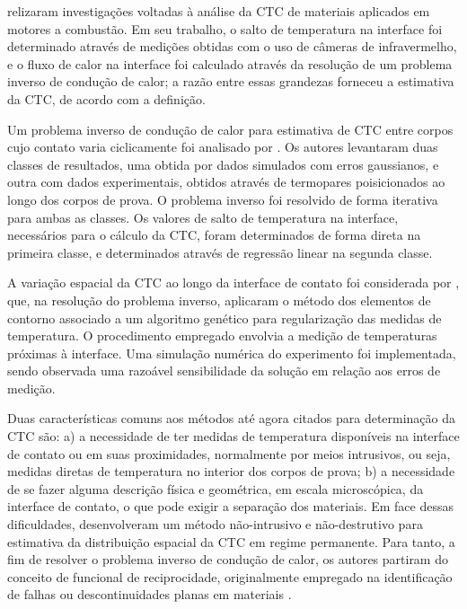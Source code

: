 \cite{artigo_fieberg} relizaram investigações voltadas à análise da CTC de materiais aplicados em motores a combustão. Em seu trabalho, o salto de temperatura
na interface foi determinado através de medições obtidas com o uso de câmeras de infravermelho, e o fluxo de calor na interface foi calculado
através da resolução de um problema inverso de condução de calor; a razão entre essas grandezas forneceu a estimativa da CTC, de acordo
com a definição.   

Um problema inverso de condução de calor para estimativa de CTC entre corpos cujo contato varia ciclicamente foi analisado por \cite{artigo_shoj}.
Os autores levantaram duas classes de resultados, uma obtida por dados simulados com erros gaussianos, e outra com dados experimentais, obtidos através
de termopares poisicionados ao longo dos corpos de prova. O problema
inverso foi resolvido de forma iterativa para ambas as classes. Os valores de salto de temperatura na interface, necessários para o cálculo da CTC,
foram determinados de forma direta na primeira classe, e determinados através de regressão linear na segunda classe. 

A variação espacial da CTC ao longo da interface de contato foi considerada por \cite{artigo_gill}, que, na resolução do problema inverso, aplicaram
o método dos elementos de contorno \citep{livro_bem} associado a um algoritmo genético para regularização das medidas de temperatura. O procedimento empregado
envolvia a medição de temperaturas próximas à interface. Uma simulação numérica do experimento foi implementada, sendo observada uma razoável sensibilidade
da solução em relação aos erros de medição. 

Duas características comuns aos métodos até agora citados para determinação da CTC são: a) a necessidade de ter medidas de temperatura disponíveis na interface de contato ou em suas proximidades,
normalmente por meios intrusivos, ou seja, medidas diretas de temperatura no interior dos corpos de prova; b) a necessidade de se fazer alguma descrição física e geométrica, em
escala microscópica, da interface de contato, o que pode exigir a separação dos materiais. Em face dessas dificuldades, \cite{reciproc_3} desenvolveram
um método não-intrusivo e não-destrutivo para estimativa da distribuição espacial da CTC em regime permanente. Para tanto, a fim de resolver o problema inverso de condução de calor, os autores partiram do conceito de funcional de reciprocidade, originalmente
empregado na identificação de falhas ou descontinuidades planas em materiais \citep{artigo_andrieux}.

